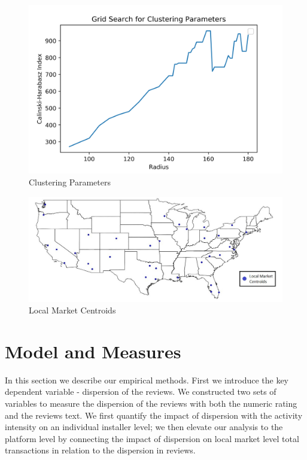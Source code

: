 \documentclass[msom,blindrev]{informs3}
\begin{document}
\begin{figure}
	\centering
	\includegraphics[width=1\linewidth]{optics_parameter_gridsearch.png}
	\caption{Clustering Parameters}
	\label{optics_parameter_gridsearch}
\end{figure}

\begin{figure}
	\centering
	\includegraphics[width=1\linewidth]{markets.jpg}
	\caption{Local Market Centroids}
	\label{fig:markets}
\end{figure}


\section{Model and Measures}
In this section we describe our empirical methods. First we introduce the key dependent variable - dispersion of the reviews. We constructed two sets of variables to measure the dispersion of the reviews with both the numeric rating and the reviews text. We first quantify the impact of dispersion with the activity intensity on an individual installer level; we then elevate our analysis to the platform level by connecting the impact of dispersion on local market level total transactions in relation to the dispersion in reviews.
\end{document}
